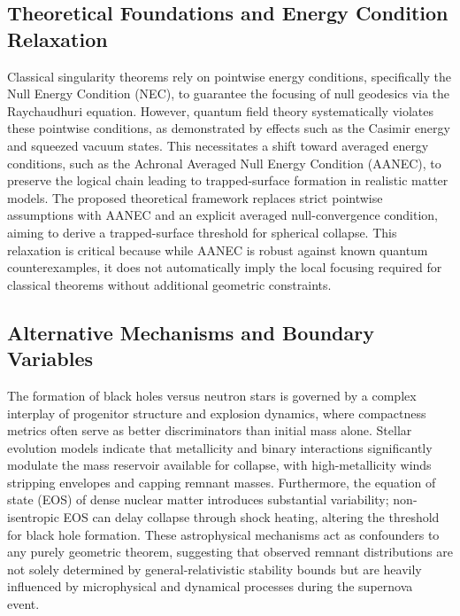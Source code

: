 \documentclass[conference]{IEEEtran}
\begin{document}
\subsection{Theoretical Foundations and Energy Condition Relaxation}
Classical singularity theorems rely on pointwise energy conditions, specifically the Null Energy Condition (NEC), to guarantee the focusing of null geodesics via the Raychaudhuri equation. However, quantum field theory systematically violates these pointwise conditions, as demonstrated by effects such as the Casimir energy and squeezed vacuum states. This necessitates a shift toward averaged energy conditions, such as the Achronal Averaged Null Energy Condition (AANEC), to preserve the logical chain leading to trapped-surface formation in realistic matter models. The proposed theoretical framework replaces strict pointwise assumptions with AANEC and an explicit averaged null-convergence condition, aiming to derive a trapped-surface threshold for spherical collapse. This relaxation is critical because while AANEC is robust against known quantum counterexamples, it does not automatically imply the local focusing required for classical theorems without additional geometric constraints.~\cite{cite_0ed84243cf171bc4}

\subsection{Alternative Mechanisms and Boundary Variables}
The formation of black holes versus neutron stars is governed by a complex interplay of progenitor structure and explosion dynamics, where compactness metrics often serve as better discriminators than initial mass alone. Stellar evolution models indicate that metallicity and binary interactions significantly modulate the mass reservoir available for collapse, with high-metallicity winds stripping envelopes and capping remnant masses. Furthermore, the equation of state (EOS) of dense nuclear matter introduces substantial variability; non-isentropic EOS can delay collapse through shock heating, altering the threshold for black hole formation. These astrophysical mechanisms act as confounders to any purely geometric theorem, suggesting that observed remnant distributions are not solely determined by general-relativistic stability bounds but are heavily influenced by microphysical and dynamical processes during the supernova event.~\cite{cite_7a44e6730c44cb39}
\end{document}
